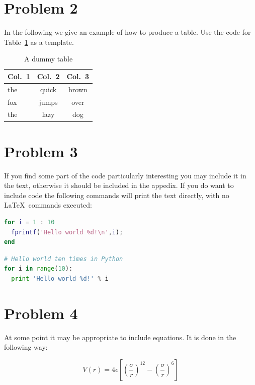 \section*{Problem 2}

In the following we give an example of how to produce a table.
Use the code for Table~\ref{tab1} as a template.

\begin{table}[!ht]
  \begin{center}
    \caption{A dummy table}
    \begin{tabular}{l|c|c}\hline\hline
      \textbf{Col.~1} & \textbf{Col.~2} & \textbf{Col.~3} \\ \hline
      the & quick & brown \\ 
      fox & jumps & over \\ 
      the & lazy  & dog \\ 
      \hline\hline
    \end{tabular}
    \label{tab1}
  \end{center}
\end{table}

\section*{Problem 3}

If you find some part of the code particularly interesting you may 
include it in the text, otherwise it should be included in the appedix.
If you do want to include code the following commands will print
the text directly, with no \LaTeX~commands executed:

\begin{lstlisting}[language=matlab]
% Hello world ten times in MATLAB
for i = 1 : 10
  fprintf('Hello world %d!\n',i);
end
\end{lstlisting}

\begin{lstlisting}[language=python]
# Hello world ten times in Python
for i in range(10):
  print 'Hello world %d!' % i
\end{lstlisting}

\section*{Problem 4}
At some point it may be appropriate to include equations. It is done in the
following way:

\begin{equation}
  V(r) = 4\epsilon \left[ \left( \frac{\sigma}{r} \right)^{12} - 
    \left(\frac{\sigma}{r} \right)^{6} \right]
\end{equation}

